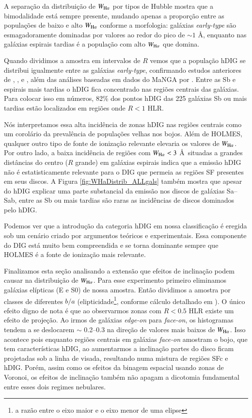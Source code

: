 A separação da distribuição de $W_{\Ha}$ por tipos de Hubble mostra que a bimodalidade está sempre presente, mudando apenas a proporção entre as populações de baixo e alto $W_{\Ha}$ conforme a morfologia: galáxias {\em early-type} são esmagadoramente dominadas por valores ao redor do pico de $\sim 1$ \AA, enquanto nas galáxias espirais tardias é a população com alto $W_{\Ha}$ que domina.

Quando dividimos a amostra em intervalos de $R$ vemos que a população hDIG se distribui igualmente entre as galáxias {\em early-type}, confirmando estudos anteriores de \citet{Kehrig.etal.2012}, \citet{Singh.etal.2013}, e \citet{Gomes.etal.2016b}, além das análises baseadas em dados do MaNGA por \citet{Belfiore.etal.2016, Belfiore.etal.2017}. Entre as Sb e espirais mais tardias o hDIG fica concentrado nas regiões centrais das galáxias. Para colocar isso em números, 82\% dos pontos hDIG das 225 galáxias Sb ou mais tardias estão localizados em regiões onde $R < 1$ HLR.

Nós interpretamos essa alta incidência de zonas hDIG nas regiões centrais como um corolário da prevalência de populações velhas nos bojos. Além de HOLMES, qualquer outro tipo de fonte de ionização relevante elevaria os valores de $W_{\Ha}$. Por outro lado, a baixa incidência de regiões com $W_{\Ha} < 3$ \AA\ situadas a grandes distâncias do centro ($R$ grande) em galáxias espirais indica que a emissão hDIG não é estatisticamente relevante para o DIG que permeia as regiões SF presentes em seus discos. A Figura \ref{fig:WHaDistrib_ALLgals} também mostra que apesar do hDIG explicar uma parte substancial da emissão nos discos de galáxias Sa--Sab, entre as Sb ou mais tardias são raras as incidências de discos dominados pelo hDIG.

Podemos ver que a introdução da categoria hDIG em nossa classificação é eregida sob um cenário criado por argumentos teóricos e experimentais. Essa componente do DIG está muito bem compreendida e se torna dominante sempre que HOLMES é a fonte de ionização mais relevante.

Finalizamos esta seção analisando a extensão que efeitos de inclinação podem causar na distribuição de $W_{\Ha}$.  Para esse experimento primeiro eliminamos galáxias elípticas (E e S0) de nossa amostra. Então dividimos a amostra por classes de diferentes $b/a$ (elipticidade\footnote{a razão entre o eixo maior e o eixo menor de uma elipse}, conforme cálculo detalhado em \citealt{deAmorim.etal.2017}). O único efeito digno de nota é que ao observarmos zonas com $R < 0.5$ HLR existe um efeito de projeção. Ao irmos de galáxias {\em edge-on} para {\em face-on}, os histogramas tendem a se deslocarem $\sim$ 0.2--0.3 na direção de valores mais baixos de $W_{\Ha}$. Isso acontece pois enquanto regiões centrais em galáxias {\em face-on} amostram o bojo, que tem características hDIG, ao aumentarmos a inclinação partes do disco ficam projetadas sob a linha de visada, resultando numa mistura de regiões SFc e hDIG. Porém, assim como os efeitos da binagem espacial usando zonas de Voronoi, os efeitos de inclinação também não apagam a dicotomia fundamental entre esses dois regimes nebulares.

